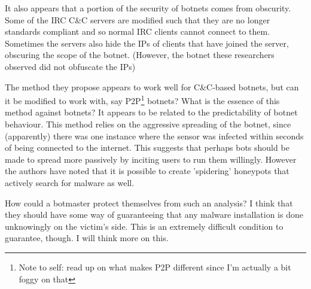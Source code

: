 \documentclass{article}
\begin{document}
		It also appears that a portion of the security of botnets comes from obscurity. Some of the IRC C\&C servers are modified such that they are no longer standards compliant and so normal IRC clients cannot connect to them. Sometimes the servers also hide the IPs of clients that have joined the server, obscuring the scope of the botnet. (However, the botnet these researchers observed did not obfuscate the IPs)
		
		The method they propose appears to work well for C\&C-based botnets, but can it be modified to work with, say P2P\footnote{Note to self: read up on what makes P2P different since I'm actually a bit foggy on that} botnets? What is the essence of this method against botnets? It appears to be related to the predictability of botnet behaviour. This method relies on the aggressive spreading of the botnet, since (apparently) there was one instance where the sensor was infected within seconds of being connected to the internet. This suggests that perhaps bots should be made to spread more passively by inciting users to run them willingly. However the authors have noted that it is possible to create 'spidering' honeypots that actively search for malware as well.
		
		How could a botmaster protect themselves from such an analysis? I think that they should have some way of guaranteeing that any malware installation is done unknowingly on the victim's side. This is an extremely difficult condition to guarantee, though. I will think more on this.
	\printbibliography
\end{document}
